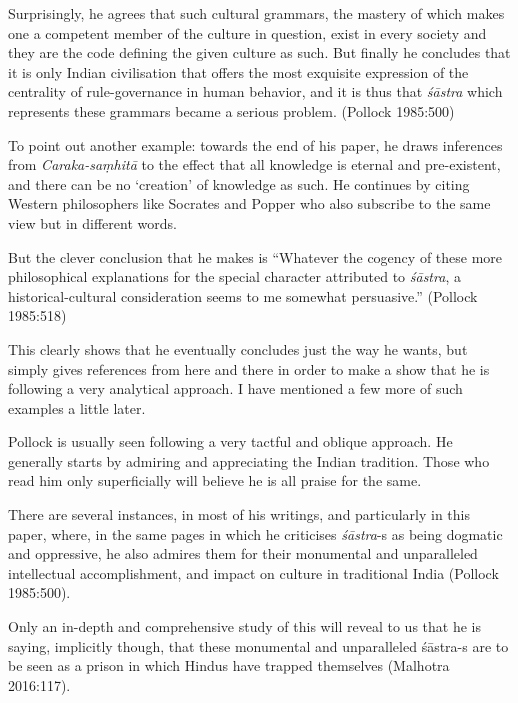 Surprisingly, he agrees that such cultural grammars, the mastery of which makes one a competent member of the culture in question, exist in every society and they are the code defining the given culture as such. But finally he concludes that it is only Indian civilisation that offers the most exquisite expression of the centrality of rule-governance in human behavior, and it is thus that {\sl śāstra} which represents these grammars became a serious problem. (Pollock 1985:500)

To point out another example: towards the end of his paper, he draws inferences from \textsl{Caraka-saṃhitā} to the effect that all knowledge is eternal and pre-existent, and there can be no `creation' of knowledge as such. He continues by citing Western philosophers like Socrates and Popper who also subscribe to the same view but in different words. 

But the clever conclusion that he makes is ``Whatever the cogency of these more philosophical explanations for the special character attributed to {\it śāstra}, a historical-cultural consideration seems to me somewhat persuasive.'' (Pollock 1985:518) 

This clearly shows that he eventually concludes just the way he wants, but simply gives references from here and there in order to make a show that he is following a very analytical approach. I have mentioned a few more of such examples a little later.

Pollock is usually seen following a very tactful and oblique approach. He generally starts by admiring and appreciating the Indian tradition. Those who read him only superficially will believe he is all praise for the same. 

There are several instances, in most of his writings, and particularly in this paper, where, in the same pages in which he criticises {\it śāstra}-s as being dogmatic and oppressive, he also admires them for their monumental and unparalleled intellectual accomplishment, and impact on culture in traditional India (Pollock 1985:500). 

Only an in-depth and comprehensive study of this will reveal to us that he is saying, implicitly though, that these monumental and unparalleled śāstra-s are to be seen as a prison in which Hindus have trapped themselves (Malhotra 2016:117).

